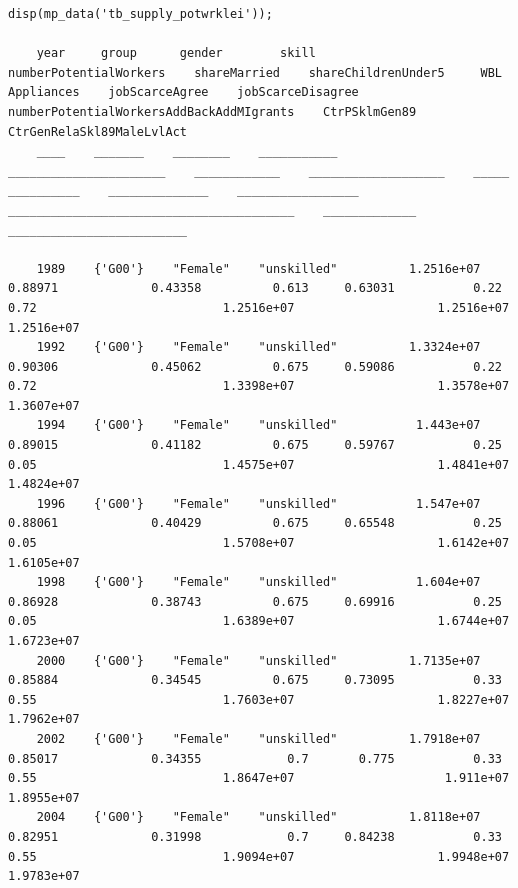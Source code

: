 \documentclass[
]{book}
\begin{document}
\begin{verbatim}
disp(mp_data('tb_supply_potwrklei'));

    year     group      gender        skill       numberPotentialWorkers    shareMarried    shareChildrenUnder5     WBL     Appliances    jobScarceAgree    jobScarceDisagree    numberPotentialWorkersAddBackAddMIgrants    CtrPSklmGen89    CtrGenRelaSkl89MaleLvlAct
    ____    _______    ________    ___________    ______________________    ____________    ___________________    _____    __________    ______________    _________________    ________________________________________    _____________    _________________________

    1989    {'G00'}    "Female"    "unskilled"          1.2516e+07            0.88971             0.43358          0.613     0.63031           0.22               0.72                          1.2516e+07                    1.2516e+07             1.2516e+07        
    1992    {'G00'}    "Female"    "unskilled"          1.3324e+07            0.90306             0.45062          0.675     0.59086           0.22               0.72                          1.3398e+07                    1.3578e+07             1.3607e+07        
    1994    {'G00'}    "Female"    "unskilled"           1.443e+07            0.89015             0.41182          0.675     0.59767           0.25               0.05                          1.4575e+07                    1.4841e+07             1.4824e+07        
    1996    {'G00'}    "Female"    "unskilled"           1.547e+07            0.88061             0.40429          0.675     0.65548           0.25               0.05                          1.5708e+07                    1.6142e+07             1.6105e+07        
    1998    {'G00'}    "Female"    "unskilled"           1.604e+07            0.86928             0.38743          0.675     0.69916           0.25               0.05                          1.6389e+07                    1.6744e+07             1.6723e+07        
    2000    {'G00'}    "Female"    "unskilled"          1.7135e+07            0.85884             0.34545          0.675     0.73095           0.33               0.55                          1.7603e+07                    1.8227e+07             1.7962e+07        
    2002    {'G00'}    "Female"    "unskilled"          1.7918e+07            0.85017             0.34355            0.7       0.775           0.33               0.55                          1.8647e+07                     1.911e+07             1.8955e+07        
    2004    {'G00'}    "Female"    "unskilled"          1.8118e+07            0.82951             0.31998            0.7     0.84238           0.33               0.55                          1.9094e+07                    1.9948e+07             1.9783e+07        

\end{verbatim}
\end{document}
